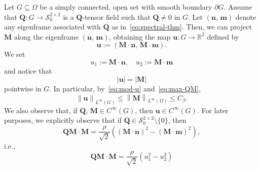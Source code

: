 \documentclass[a4paper, 11pt, twoside, leqno]{article}
\theoremstyle{definition}              %
\theoremstyle{remark}                  %
\newcommand{\abs}[1]{\left| #1 \right|}                             %
\newcommand{\norm}[1]{\left\| #1 \right\|}                          %
\newcommand{\R}{\mathbb{R}}
\newcommand{\Q}{\mathbf{Q}}
\newcommand{\M}{\mathbf{M}}
\newcommand{\n}{\mathbf{n}}
\newcommand{\m}{\mathbf{m}}
\renewcommand{\u}{\mathbf{u}}
\newcommand{\Sz}{\mathscr{S}_0^{2\times 2}}
\begin{document}
Let $G \subseteq \Omega$ be a simply connected, open set with smooth boundary $\partial G$. Assume that $\Q : G \to \Sz$ is a $\Q$-tensor field such that $\Q \neq 0$ in $G$. Let $(\n,\,\m)$ denote any eigenframe associated with $\Q$ as in~\eqref{eq:spectral-thm}. 
Then, we can project $\M$ along the eigenframe $(\n,\,\m)$, obtaining the map $\u : G \to \R^2$ defined by
\begin{equation}\label{eq:u}
   \u := \left(\M\cdot \n,\,\M\cdot \m\right). 
\end{equation}
We set
\begin{equation}\label{eq:u1u2}
    u_1 := \M \cdot \n, \quad 
    u_2 := \M \cdot \m
\end{equation}
and notice that
\begin{equation}\label{eq:mod-u}
    \abs{\u} = \abs{\M}
\end{equation}
pointwise in $G$. In particular, by~\eqref{eq:mod-u} and~\eqref{eq:max-QM}, 
\begin{equation}\label{eq:norm-u}
    \norm{\u}_{L^\infty(G)} \leq \norm{\M}_{L^\infty(\Omega)} \leq C_\beta.
\end{equation}
We also observe that, if $\Q$, $\M \in C^\infty(G)$, then $\u \in C^\infty(G)$. 
For later purposes, we explicitly observe that if $\Q \in \Sz \setminus \{0\}$, 
then
\[
	\Q \M \cdot \M = \frac{\rho}{\sqrt{2}}\left( (\M \cdot \n)^2 - (\M \cdot \m)^2 \right), 
\]
i.e.,
\begin{equation}\label{eq:QMM-u}
	\Q \M \cdot \M = \frac{\rho}{\sqrt{2}}\left( u_1^2 - u_2^2 \right)
\end{equation}


\end{document}

